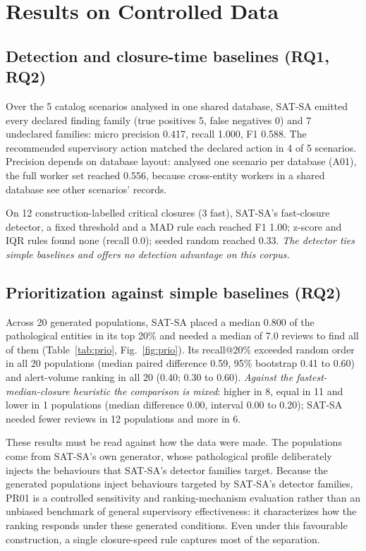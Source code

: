 \section{Results on Controlled Data}
\label{sec:results}

\subsection{Detection and closure-time baselines (RQ1, RQ2)}
Over the 5 catalog scenarios analysed in one shared database,
SAT-SA emitted every declared finding family (true positives 5, false
negatives 0) and 7 undeclared families: micro precision
0.417, recall 1.000, F1 0.588. The recommended supervisory
action matched the declared action in 4 of 5
scenarios. Precision depends on database layout: analysed one scenario per database
(A01), the full worker set reached 0.556, because cross-entity
workers in a shared database see other scenarios' records.

On 12 construction-labelled critical closures (3 fast),
SAT-SA's fast-closure detector, a fixed threshold and a MAD rule each reached F1
1.00; z-score and IQR rules found none (recall
0.0); seeded random reached 0.33.
\emph{The detector ties simple baselines and offers no detection advantage on this
corpus.}

\subsection{Prioritization against simple baselines (RQ2)}
Across 20 generated populations, SAT-SA placed a median
0.800 of the pathological entities in its top 20\% and needed a
median of 7.0 reviews to find all of them (Table~\ref{tab:prio},
Fig.~\ref{fig:prio}). Its recall@20\% exceeded random order in all
20 populations (median paired difference
0.59, 95\% bootstrap 0.41 to
0.60) and alert-volume ranking in all 20
(0.40; 0.30 to 0.60).
\emph{Against the fastest-median-closure heuristic the comparison is mixed}: higher in
8, equal in 11 and lower in
1 populations (median difference 0.00,
interval 0.00 to 0.20); SAT-SA needed fewer reviews
in 12 populations and more in 6.

These results must be read against how the data were made. The populations come from
SAT-SA's own generator, whose pathological profile deliberately injects the behaviours
that SAT-SA's detector families target. Because the generated populations inject
behaviours targeted by SAT-SA's detector families, PR01 is a controlled sensitivity
and ranking-mechanism evaluation rather than an unbiased benchmark of general
supervisory effectiveness: it characterizes how the ranking responds under these
generated conditions. Even under this favourable construction, a single closure-speed rule captures most of the separation.

